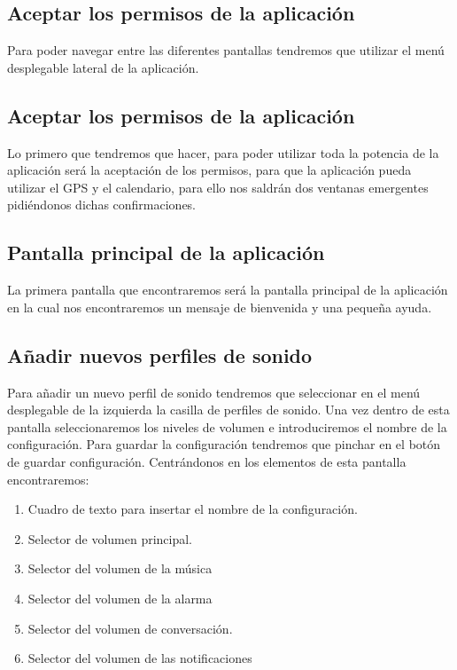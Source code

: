 \subsection{Aceptar los permisos de la aplicación}
Para poder navegar entre las diferentes pantallas tendremos que utilizar el menú desplegable lateral de la aplicación.


\subsection{Aceptar los permisos de la aplicación}
Lo primero que tendremos que hacer, para poder utilizar toda la potencia de la aplicación será la aceptación de los permisos, para que la aplicación pueda utilizar el GPS y el calendario, para ello nos saldrán dos ventanas emergentes pidiéndonos dichas confirmaciones.



\subsection{Pantalla principal de la aplicación}
La primera pantalla que encontraremos será la pantalla principal de la aplicación en la cual nos encontraremos un mensaje de bienvenida y una pequeña ayuda.



\subsection{Añadir nuevos perfiles de sonido}
Para añadir un nuevo perfil de sonido tendremos que seleccionar en el menú desplegable de la izquierda la casilla de perfiles de sonido.
Una vez dentro de esta pantalla seleccionaremos los niveles de volumen e introduciremos el nombre de la configuración.
Para guardar la configuración tendremos que pinchar en el botón de guardar configuración.
Centrándonos en los elementos de esta pantalla encontraremos:
\begin{enumerate}
\item Cuadro de texto para insertar el nombre de la configuración.
\item Selector de volumen principal.
\item Selector del volumen de la música
\item Selector del volumen de la alarma
\item Selector del volumen de conversación.
\item Selector del volumen de las notificaciones
\end{enumerate}

